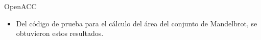 \documentclass[aspectratio=169]{beamer}
\begin{document}
\begin{frame}{OpenACC}
    \begin{itemize}
        \item Del código de prueba para el cálculo del área del conjunto de Mandelbrot, se obtuvieron estos resultados.
    \end{itemize}

    \begin{figure}
        \centering
    \end{figure}
\end{frame}


\end{document}
